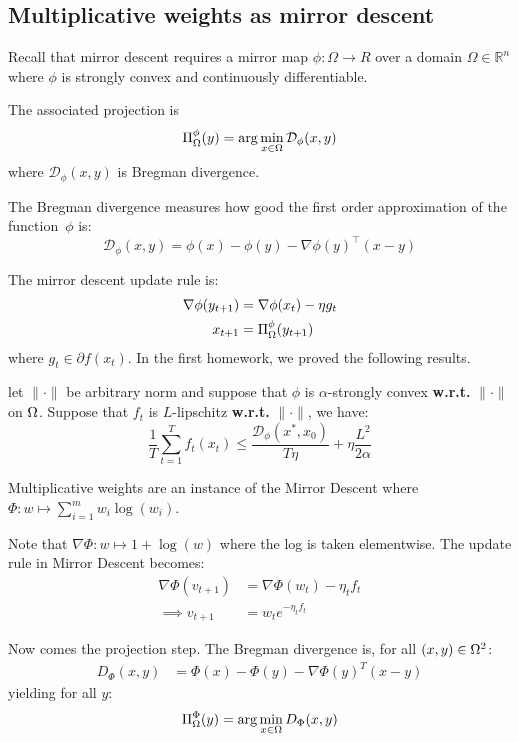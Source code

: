 \subsection{Multiplicative weights as mirror descent}

Recall that mirror descent requires a mirror map $\phi : \Omega \to R$ over a
domain $\Omega \in \mathbb{R}^n$ where $\phi$ is strongly convex and
continuously differentiable.

The associated projection is
\begin{equation*}
    \Pi^\phi_\Omega (y) = \arg\min_{x\in\Omega} \mathcal{D}_\phi(x,y)
\end{equation*}
where $\mathcal{D}_\phi(x,y)$ is Bregman divergence.
\begin{definition}
The Bregman divergence measures how good the first order approximation of the
function~$\phi$ is:
    \begin{equation*}
        \mathcal{D}_\phi(x,y) = \phi(x) - \phi(y) - \nabla \phi(y) ^\intercal (x-y)
    \end{equation*}
\end{definition}
The mirror descent update rule is:
\begin{align*}
    \nabla \phi(y_{t+1}) &= \nabla \phi (x_t) - \eta g_t \\
    x_{t+1} &=  \Pi^\phi_\Omega (y_{t+1})
\end{align*}
where $g_t \in \partial f(x_t).$ 
In the first homework, we proved the following results.
\begin{theorem}
    let $\|\cdot\|$ be arbitrary norm and suppose that $\phi$ is $\alpha$-strongly convex      \textbf{w.r.t.} $\|\cdot\|$ on $\Omega$. Suppose that $f_t$ is $L$-lipschitz \textbf{w.r.t.} $\|\cdot\|$, we have:
    \begin{equation*}
        \frac{1}{T}\sum^T_{t=1} f_t(x_t) \leq \frac{ \mathcal{D}_\phi(x^*,x_0)}{T \eta}+ \eta \frac{L^2}{2\alpha}
    \end{equation*}
\end{theorem}


Multiplicative weights are an instance of the Mirror Descent where $\Phi: w\mapsto \sum_{i=1}^m w_i \log(w_i)$.

Note that $\nabla\Phi : w\mapsto 1 + \log(w)$ where the log is taken elementwise.
The update rule in Mirror Descent becomes:
\begin{align*}
    \nabla\Phi(v_{t+1}) &=\nabla\Phi(w_{t}) - \eta_tf_t \\
    \implies v_{t+1} &= w_te^{-\eta_t f_t}
\end{align*}

Now comes the projection step. The Bregman divergence is, for all $(x,y)\in\Omega^2$:
\begin{align*}
    D_{\Phi}(x,y) &= \Phi(x)-\Phi(y) - \nabla\Phi(y)^T(x-y)
\end{align*}
yielding for all $y$:
\begin{align*}
    \Pi_{\Omega}^{\Phi}(y) = \arg\min_{x\in\Omega}D_{\Phi}(x,y)
\end{align*}
